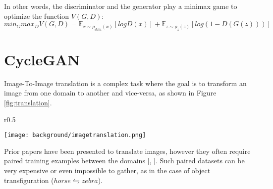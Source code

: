 In other words, the discriminator and the generator play a minimax game to optimize the function $V(G,D)$:
\begin{equation}
  \label{eq:ganloss}
  min_G max_D V(G,D) = \mathbb{E}_{x\sim \rho_{data}(x)}[log D(x)] + \mathbb{E}_{z\sim \rho_{z}(z)}[log (1-D(G(z)))]
\end{equation}

\section{CycleGAN}
Image-To-Image translation is a complex task where the goal is to transform an image from one domain to another and vice-versa, as shown in Figure \ref{fig:translation}.
\begin{wrapfigure}{r}{0.5\textwidth}
  \begin{center}
    \texttt{[image: background/imagetranslation.png]}
  \end{center}
  \caption{Image-to-image translation example \citep{CycleGAN2017}.}
  \label{fig:translation}
\end{wrapfigure}
Prior papers have been presented to translate images, however they often require paired training examples between the domains [\citet{https://doi.org/10.48550/arxiv.1612.00835}, \citet{karakan}].
Such paired datasets can be very expensive or even impossible to gather, as in the case of object transfiguration ($horse \leftrightharpoons zebra$).

